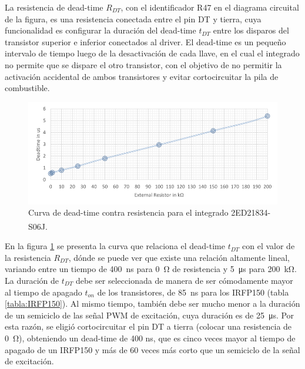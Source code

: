 La resistencia de dead-time $R_{DT}$, con el identificador R47 en el diagrama circuital de la figura, es una resistencia conectada entre el pin DT y tierra, cuya funcionalidad es configurar la duración del dead-time $t_{DT}$ entre los disparos del transistor superior e inferior conectados al driver. El dead-time es un pequeño intervalo de tiempo luego de la desactivación de cada llave, en el cual el integrado no permite que se dispare el otro transistor, con el objetivo de no permitir la activación accidental de ambos transistores y evitar cortocircuitar la pila de combustible.

\begin{figure}[h]
    \centering
    \includegraphics[scale=0.5]{Imagenes/Curva Dead-Time.png}
    \caption{Curva de dead-time contra resistencia para el integrado 2ED21834-S06J.\textsuperscript{\cite{DatasheetDriver}}}
    \label{curva_deadtime}
\end{figure}

En la figura \ref{curva_deadtime} se presenta la curva que relaciona el dead-time $t_{DT}$ con el valor de la resistencia $R_{DT}$, dónde se puede ver que existe una relación altamente lineal, variando entre un tiempo de \SI{400}{\nano\second} para \SI[]{0}{\ohm} de resistencia y \SI[]{5}{\micro\second} para \SI[]{200}{\kilo\ohm}.\\

La duración de $t_{DT}$ debe ser seleccionada de manera de ser cómodamente mayor al tiempo de apagado $t_{on}$ de los transistores, de \SI[]{85}{\nano\second} para los IRFP150 (tabla \ref{tabla:IRFP150}). Al mismo tiempo, también debe ser mucho menor a la duración de un semiciclo de las señal PWM de excitación, cuya duración es de \SI[]{25}{\micro\second}. Por esta razón, se eligió {\Medium cortocircuitar el pin DT a tierra} (colocar una resistencia de \SI[]{0}{\ohm}), obteniendo un {\Medium dead-time de 400 ns}, que es cinco veces mayor al tiempo de apagado de un IRFP150 y más de 60 veces más corto que un semiciclo de la señal de excitación.\\

